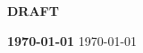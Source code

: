 \begin{titlepage}
\begin{center}
    
    \vfill


    \ifx\DEPARTMENT\undefined
    \else
      \Large \DEPARTMENT  \\
    \fi

    \ifx\INSTITUTION\undefined
    \else
      \Large \INSTITUTION  \\
    \fi

    \if{}
      \vspace{0.5cm}
      \Huge \textbf{DRAFT} \\
    \fi

    \if{}
      \draftdate
      \Large \textbf{\today}
    \else
      \monthyeardate
      \Large \today
    \fi


  \end{center}
\end{titlepage}

